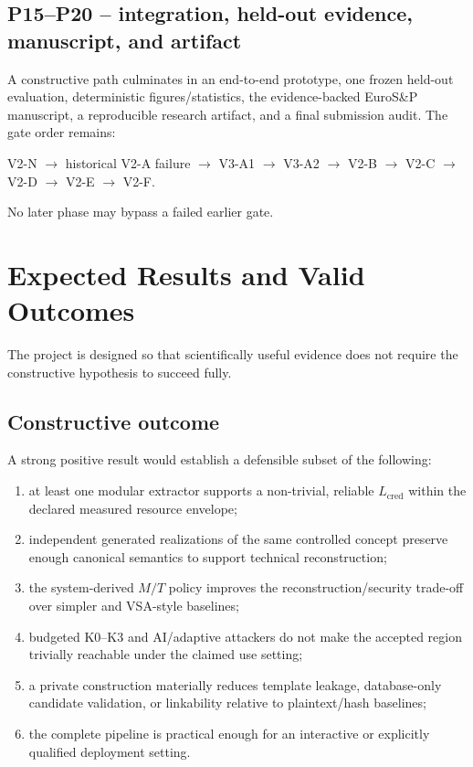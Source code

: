 \documentclass[11pt,a4paper]{article}
\begin{document}
\subsection{P15--P20 -- integration, held-out evidence, manuscript, and artifact}

A constructive path culminates in an end-to-end prototype, one frozen held-out evaluation, deterministic figures/statistics, the evidence-backed EuroS\&P manuscript, a reproducible research artifact, and a final submission audit. The gate order remains:

\begin{center}
\small
V2-N $\rightarrow$ historical V2-A failure $\rightarrow$ V3-A1 $\rightarrow$ V3-A2 $\rightarrow$ V2-B $\rightarrow$ V2-C $\rightarrow$ V2-D $\rightarrow$ V2-E $\rightarrow$ V2-F.
\end{center}

No later phase may bypass a failed earlier gate.

\section{Expected Results and Valid Outcomes}

The project is designed so that scientifically useful evidence does not require the constructive hypothesis to succeed fully.

\subsection{Constructive outcome}

A strong positive result would establish a defensible subset of the following:
\begin{enumerate}
  \item at least one modular extractor supports a non-trivial, reliable $L_{\mathrm{cred}}$ within the declared measured resource envelope;
  \item independent generated realizations of the same controlled concept preserve enough canonical semantics to support technical reconstruction;
  \item the system-derived $M/T$ policy improves the reconstruction/security trade-off over simpler and VSA-style baselines;
  \item budgeted K0--K3 and AI/adaptive attackers do not make the accepted region trivially reachable under the claimed use setting;
  \item a private construction materially reduces template leakage, database-only candidate validation, or linkability relative to plaintext/hash baselines;
  \item the complete pipeline is practical enough for an interactive or explicitly qualified deployment setting.
\end{enumerate}
\end{document}
